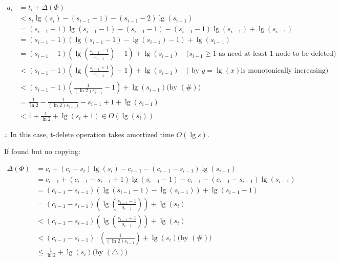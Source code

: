\documentclass[12pt]{article}
\begin{document}
$\begin{aligned}a_{i}&=t_i+\Delta(\Phi)\\
& <s_i \lg \left(s_i\right)-\left(s_{i-1}-1\right)-\left(s_{i-1}-2\right) \lg \left(s_{i-1}\right) \\
& =\left(s_{i-1}-1\right) \lg \left(s_{i-1}-1\right)-\left(s_{i-1}-1\right)-\left(s_{i-1}-1\right) \lg \left(s_{i-1}\right)+\lg \left(s_{i-1}\right) \\
&=\left(s_{i-1}-1\right)\left(\lg \left(s_{i-1}-1\right)-\lg \left(s_{i-1}\right)-1\right)+\lg \left(s_{i-1}\right) \\
& =\left(s_{i-1}-1\right)\left(\lg \left(\frac{s_{i-1}-1}{s_{i-1}}\right)-1\right)+\lg\left(s_{i-1}\right)\quad(s_{i-1} \geq 1 \text{ as need at least 1 node to be deleted)}\\
& <\left(s_{i-1}-1\right)\left(\lg \left(\frac{s_{i-1}+1}{s_{i-1}}\right)-1\right)+\lg\left(s_{i-1}\right)\quad \text {( by } y=\lg (x) \text{is monotonically increasing)} \\
& <\left(s_{i-1}-1\right)\left(\frac{1}{(\ln 2)s_{i-1}}-1\right)+\lg \left(s_{i-1}\right)\text {(by } (\#)\text {)} \\
&=\frac{1}{\ln2}-\frac{1}{(\ln 2)s_{i-1})}-s_{i-1}+1+\lg \left(s_{i-1}\right)\\
&<1+\frac{1}{\ln 2}+\lg \left(s_{i}+1\right) \in O\left(\lg \left(s_{i}\right)\right)
\end{aligned} $


$\therefore $ In this case, t-delete operation takes amortized time $O(\lg s)$.

If found but no copying:


$\begin{aligned}\Delta(\Phi) & =c_i+\left(c_i-s_i\right)\lg\left(s_i\right)-c_{i-1}-\left(c_{i-1}-s_{i-1}\right) \lg \left(s_{i-1}\right) \\
&=c_{i-1}+\left(c_{i-1}-s_{i-1}+1\right) \lg \left(s_{i-1}-1\right)-c_{i-1}-\left(c_{i-1}-s_{i-1}\right) \lg \left(s_{i-1}\right) \\
&=\left(c_{i-1}-s_{i-1}\right)\left(\lg \left(s_{i-1}-1\right)-\lg \left(s_{i-1}\right)\right)+\lg \left(s_{i-1}-1\right) \\
& =\left(c_{i-1}-s_{i-1}\right)\left(\lg \left(\frac{s_{i-1}-1}{s_{i-1}}\right)\right)+\lg \left(s_i\right) \\
& <\left(c_{i-1}-s_{i-1}\right)\left(\lg\left(\frac{s_{i-1}+1}{s_{i-1}}\right)\right)+\lg \left(s_i\right) \\
& <\left(c_{i-1}-s_{i-1}\right) \cdot\left(\frac{1}{(\ln2)s_{i-1}}\right)+\lg \left(s_i\right) \text{(by } (\#) \text{) }\\
&\leqslant \frac{1}{\ln 2}+\lg \left(s_i\right) \text{(by } (\triangle) \text{)}
\end{aligned} $
\end{document}

